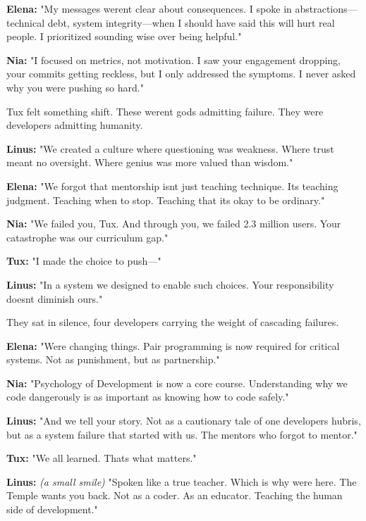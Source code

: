 \textbf{Elena:} "My messages weren\textquotesingle t clear about consequences. I spoke in abstractions---\textquotesingle technical debt,\textquotesingle{} \textquotesingle system integrity\textquotesingle---when I should have said \textquotesingle this will hurt real people.\textquotesingle{} I prioritized sounding wise over being helpful."

\textbf{Nia:} "I focused on metrics, not motivation. I saw your engagement dropping, your commits getting reckless, but I only addressed the symptoms. I never asked why you were pushing so hard."

Tux felt something shift. These weren\textquotesingle t gods admitting failure. They were developers admitting humanity.

\textbf{Linus:} "We created a culture where questioning was weakness. Where \textquotesingle trust\textquotesingle{} meant \textquotesingle no oversight.\textquotesingle{} Where genius was more valued than wisdom."

\textbf{Elena:} "We forgot that mentorship isn\textquotesingle t just teaching technique. It\textquotesingle s teaching judgment. Teaching when to stop. Teaching that it\textquotesingle s okay to be ordinary."

\textbf{Nia:} "We failed you, Tux. And through you, we failed 2.3 million users. Your catastrophe was our curriculum gap."

\textbf{Tux:} "I made the choice to push---"

\textbf{Linus:} "In a system we designed to enable such choices. Your responsibility doesn\textquotesingle t diminish ours."

They sat in silence, four developers carrying the weight of cascading failures.

\textbf{Elena:} "We\textquotesingle re changing things. Pair programming is now required for critical systems. Not as punishment, but as partnership."

\textbf{Nia:} "Psychology of Development is now a core course. Understanding why we code dangerously is as important as knowing how to code safely."

\textbf{Linus:} "And we tell your story. Not as a cautionary tale of one developer\textquotesingle s hubris, but as a system failure that started with us. The mentors who forgot to mentor."

\textbf{Tux:} "We all learned. That\textquotesingle s what matters."

\textbf{Linus:} \emph{(a small smile)} "Spoken like a true teacher. Which is why we\textquotesingle re here. The Temple wants you back. Not as a coder. As an educator. Teaching the human side of development."

